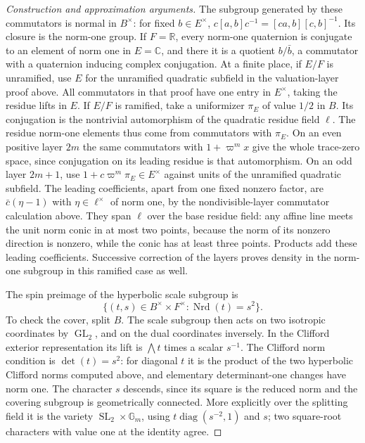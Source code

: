 \documentclass[11pt,a4paper,openany,oneside]{book}
\theoremstyle{resultstyle}
\theoremstyle{definition}
\numberwithin{equation}{chapter}
\begin{document}
\begin{proof}[Construction and approximation arguments]
The subgroup generated by these
commutators is normal in \(B^\times\):
for fixed \(b\in E^\times\),
\(c[a,b]c^{-1}=[ca,b][c,b]^{-1}\).
Its closure is the norm-one group.
If \(F=\mathbb R\), every norm-one
quaternion is conjugate to an element
of norm one in \(E=\mathbb C\),
and there it is a quotient \(b/\bar b\),
a commutator with a quaternion inducing
complex conjugation. At a finite place,
if \(E/F\) is unramified, use \(E\)
for the unramified quadratic subfield
in the valuation-layer proof above.
All commutators in that proof have
one entry in \(E^\times\), taking
the residue lifts in \(E\).
If \(E/F\) is ramified, take a
uniformizer \(\pi_E\) of value \(1/2\)
in \(B\). Its conjugation is the
nontrivial automorphism of the
quadratic residue field \(\ell\).
The residue norm-one elements thus
come from commutators with \(\pi_E\).
On an even positive layer \(2m\)
the same commutators with
\(1+\varpi^m x\) give the whole
trace-zero space, since conjugation
on its leading residue is that
automorphism. On an odd layer
\(2m+1\), use
\(1+c\varpi^m\pi_E\in E^\times\)
against units of the unramified
quadratic subfield. The leading
coefficients, apart from one fixed
nonzero factor, are
\(\bar c(\eta-1)\) with
\(\eta\in\ell^\times\) of norm one,
by the nondivisible-layer
commutator calculation above.
They span \(\ell\) over the base
residue field: any affine line
meets the unit norm conic in at
most two points, because the norm
of its nonzero direction is
nonzero, while the conic has at
least three points. Products add
these leading coefficients.
Successive correction of the
layers proves density in the
norm-one subgroup in this
ramified case as well.

The spin preimage of the
hyperbolic scale subgroup is
\[
 \{(t,s)\in B^\times\times F^\times:
              \operatorname{Nrd}(t)=s^2\}.
\]
To check the cover, split \(B\).
The scale subgroup then acts on
two isotropic coordinates by
\(\operatorname{GL}_2\), and on
the dual coordinates inversely.
In the Clifford exterior
representation its lift is
\(\bigwedge t\) times a scalar
\(s^{-1}\). The Clifford norm
condition is \(\det(t)=s^2\):
for diagonal \(t\) it is the
product of the two hyperbolic
Clifford norms computed above,
and elementary determinant-one
changes have norm one. The
character \(s\) descends, since
its square is the reduced norm
and the covering subgroup is
geometrically connected. More
explicitly over the splitting
field it is the variety
\(\operatorname{SL}_2\times\mathbb G_m\),
using \(t\operatorname{diag}(s^{-2},1)\)
and \(s\); two square-root
characters with value one at
the identity agree.


\end{proof}
\end{document}
